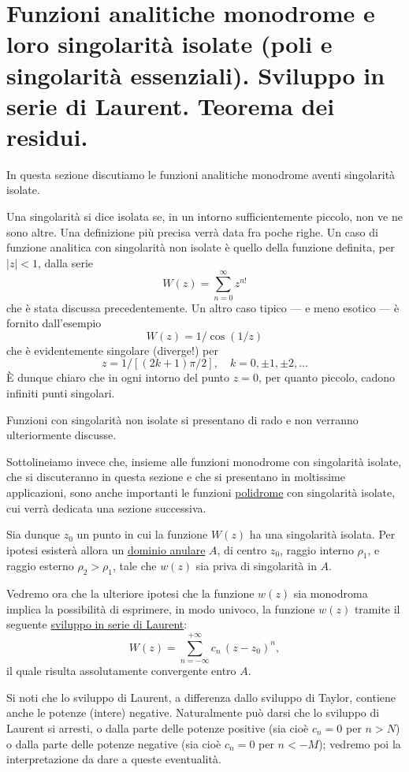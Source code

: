 \documentclass[11pt, a4paper]{book}
\numberwithin{equation}{section}
\begin{document}
\section{Funzioni analitiche monodrome e loro singolarità isolate (poli e singolarità essenziali). Sviluppo in serie di Laurent. Teorema dei residui.}

In questa sezione discutiamo le funzioni analitiche monodrome aventi singolarità isolate.

Una singolarità si dice isolata se, in un intorno sufficientemente piccolo, non ve ne sono altre. Una definizione più precisa verrà data fra poche righe. Un caso di funzione analitica con singolarità non isolate è quello della funzione definita, per $|z| < 1$, dalla serie
\[
W(z) = \sum_{n=0}^{\infty} z^{n!}
\]
che è stata discussa precedentemente. Un altro caso tipico — e meno esotico — è fornito dall'esempio
\[
W(z) = 1/\cos(1/z)
\]
che è evidentemente singolare (diverge!) per
\[
z = 1\big/\!\left[(2k+1)\pi/2\right], \quad k = 0, \pm 1, \pm 2, \ldots
\]
È dunque chiaro che in ogni intorno del punto $z = 0$, per quanto piccolo, cadono infiniti punti singolari.

Funzioni con singolarità non isolate si presentano di rado e non verranno ulteriormente discusse.

Sottolineiamo invece che, insieme alle funzioni monodrome con singolarità isolate, che si discuteranno in questa sezione e che si presentano in moltissime applicazioni, sono anche importanti le funzioni \underline{polidrome} con singolarità isolate, cui verrà dedicata una sezione successiva.

Sia dunque $z_0$ un punto in cui la funzione $W(z)$ ha una singolarità isolata. Per ipotesi esisterà allora un \underline{dominio anulare} $A$, di centro $z_0$, raggio interno $\rho_1$, e raggio esterno $\rho_2 > \rho_1$, tale che $w(z)$ sia priva di singolarità in $A$.

Vedremo ora che la ulteriore ipotesi che la funzione $w(z)$ sia monodroma implica la possibilità di esprimere, in modo univoco, la funzione $w(z)$ tramite il seguente \underline{sviluppo in serie di Laurent}:
\begin{equation}
W(z) = \sum_{n=-\infty}^{+\infty} c_n\,(z - z_0)^n, \tag{1}
\end{equation}
il quale risulta assolutamente convergente entro $A$.

Si noti che lo sviluppo di Laurent, a differenza dallo sviluppo di Taylor, contiene anche le potenze (intere) negative. Naturalmente può darsi che lo sviluppo di Laurent si arresti, o dalla parte delle potenze positive (sia cioè $c_n = 0$ per $n > N$) o dalla parte delle potenze negative (sia cioè $c_n = 0$ per $n < -M$); vedremo poi la interpretazione da dare a queste eventualità.
\end{document}
